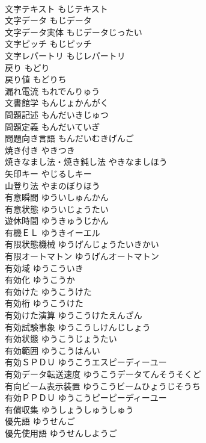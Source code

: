 \documentclass[8pt]{extreport}
\begin{document}
\begin{CJK}{UTF8}{min}
\\	文字テキスト	もじテキスト	
\\	文字データ	もじデータ	
\\	文字データ実体	もじデータじったい	
\\	文字ピッチ	もじピッチ	
\\	文字レパートリ	もじレパートリ	
\\	戻り	もどり	
\\	戻り値	もどりち	
\\	漏れ電流	もれでんりゅう	
\\	文書館学	もんじょかんがく	
\\	問題記述	もんだいきじゅつ	
\\	問題定義	もんだいていぎ	
\\	問題向き言語	もんだいむきげんご	
\\	焼き付き	やきつき	
\\	焼きなまし法・焼き鈍し法	やきなましほう	
\\	矢印キー	やじるしキー	
\\	山登り法	やまのぼりほう	
\\	有意瞬間	ゆういしゅんかん	
\\	有意状態	ゆういじょうたい	
\\	遊休時間	ゆうきゅうじかん	
\\	有機ＥＬ	ゆうきイーエル	
\\	有限状態機械	ゆうげんじょうたいきかい	
\\	有限オートマトン	ゆうげんオートマトン	
\\	有効域	ゆうこういき	
\\	有効化	ゆうこうか	
\\	有効けた	ゆうこうけた	
\\	有効桁	ゆうこうけた	
\\	有効けた演算	ゆうこうけたえんざん	
\\	有効試験事象	ゆうこうしけんじしょう	
\\	有効状態	ゆうこうじょうたい	
\\	有効範囲	ゆうこうはんい	
\\	有効ＳＰＤＵ	ゆうこうエスピーディーユー	
\\	有効データ転送速度	ゆうこうデータてんそうそくど	
\\	有向ビーム表示装置	ゆうこうビームひょうじそうち	
\\	有効ＰＰＤＵ	ゆうこうピーピーディーユー	
\\	有償収集	ゆうしょうしゅうしゅう	
\\	優先語	ゆうせんご	
\\	優先使用語	ゆうせんしようご	

\end{CJK}
\end{document}
